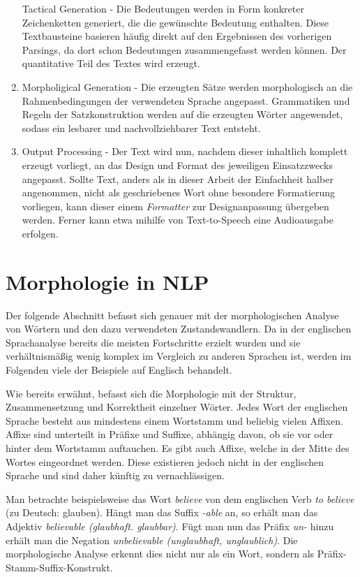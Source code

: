 \documentclass[12pt]{report}
\begin{document}
\begin{enumerate}
Tactical Generation - Die Bedeutungen werden in Form konkreter Zeichenketten generiert, die die gewünschte Bedeutung enthalten. Diese Textbausteine basieren häufig direkt auf den Ergebnissen des vorherigen Parsings, da dort schon Bedeutungen zusammengefasst werden können. Der quantitative Teil des Textes wird erzeugt.
\item
Morpholigical Generation - Die erzeugten Sätze werden morphologisch an die Rahmenbedingungen der verwendeten Sprache angepasst. Grammatiken und Regeln der Satzkonstruktion werden auf die erzeugten Wörter angewendet, sodass ein lesbarer und nachvollziehbarer Text entsteht.
\item
Output Processing - Der Text wird nun, nachdem dieser inhaltlich komplett erzeugt vorliegt, an das Design und Format des jeweiligen Einsatzzwecks angepasst. Sollte Text, anders als in dieser Arbeit der Einfachheit halber angenommen, nicht als geschriebenes Wort ohne besondere Formatierung vorliegen, kann dieser einem \textit{Formatter} zur Designanpassung übergeben werden. Ferner kann etwa mihilfe von Text-to-Speech eine Audioausgabe erfolgen. 
\end{enumerate}

\section{Morphologie in NLP}
Der folgende Abschnitt befasst sich genauer mit der morphologischen Analyse von Wörtern und den dazu verwendeten Zustandswandlern. Da in der englischen Sprachanalyse bereits die meisten Fortschritte erzielt wurden und sie verhältnismäßig wenig komplex im Vergleich zu anderen Sprachen ist, werden im Folgenden viele der Beispiele auf Englisch behandelt. 

Wie bereits erwähnt, befasst sich die Morphologie mit der Struktur, Zusammensetzung und Korrektheit einzelner Wörter. Jedes Wort der englischen Sprache besteht aus mindestens einem Wortstamm und beliebig vielen Affixen. Affixe sind unterteilt in Präfixe und Suffixe, abhängig davon, ob sie vor oder hinter dem Wortstamm auftauchen. Es gibt auch Affixe, welche in der Mitte des Wortes eingeordnet werden. Diese existieren jedoch nicht in der englischen Sprache und sind daher künftig zu vernachlässigen.

Man betrachte beispielsweise das Wort \textit{\glqq  believe\grqq{}} von dem englischen Verb \textit{\glqq  to believe\grqq{}} (zu Deutsch: \glqq  glauben\grqq{}). Hängt man das Suffix \textit{\glqq  -able\grqq{}} an, so erhält man das Adjektiv \textit{\glqq  believable\grqq{} (\glqq  glaubhaft\grqq{}. \glqq  glaubbar\grqq{})}. Fügt man nun das Präfix \textit{\glqq  un-\grqq{}} hinzu erhält man die Negation \textit{\glqq  unbelievable\grqq{} (\glqq  unglaubhaft\grqq{}, \glqq  unglaublich\grqq{})}. Die morphologische Analyse erkennt dies nicht nur als ein Wort, sondern als Präfix-Stamm-Suffix-Konstrukt.
\end{document}
